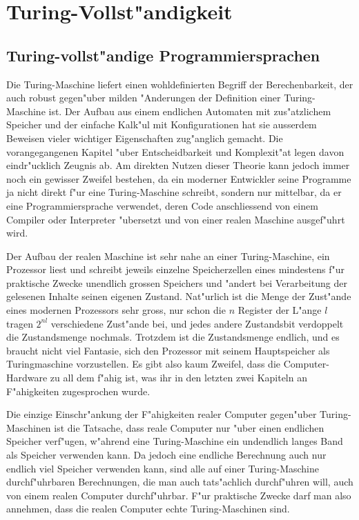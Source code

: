 %
%
%
\chapter{Turing-Vollst"andigkeit\label{chapter-vollstaendigkeit}}
\section{Turing-vollst"andige Programmiersprachen}
Die Turing-Maschine liefert einen wohldefinierten Begriff der
Berechenbarkeit, der auch robust gegen"uber milden "Anderungen
der Definition einer Turing-Maschine ist.
Der Aufbau aus einem endlichen Automaten mit zus"atzlichem
Speicher und der einfache Kalk"ul mit Konfigurationen hat
sie ausserdem Beweisen vieler wichtiger Eigenschaften zug"anglich
gemacht. Die vorangegangenen Kapitel "uber Entscheidbarkeit und
Komplexit"at legen davon eindr"ucklich Zeugnis ab. Am direkten
Nutzen dieser Theorie kann jedoch immer noch ein gewisser Zweifel
bestehen, da ein moderner Entwickler seine Programme ja nicht
direkt f"ur eine Turing-Maschine schreibt, sondern nur mittelbar,
da er eine Programmiersprache verwendet, deren Code anschliessend
von einem Compiler oder Interpreter "ubersetzt und von einer realen
Maschine ausgef"uhrt wird.

Der Aufbau der realen Maschine ist sehr
nahe an einer Turing-Maschine, ein Prozessor liest und schreibt
jeweils einzelne
Speicherzellen eines mindestens f"ur praktische Zwecke unendlich
grossen Speichers und "andert bei Verarbeitung der gelesenen
Inhalte seinen eigenen Zustand. Nat"urlich ist die Menge der
Zust"ande eines modernen Prozessors sehr gross, nur schon die $n$
Register der L"ange $l$ tragen $2^{nl}$ verschiedene Zust"ande bei,
und jedes andere Zustandsbit verdoppelt die Zustandsmenge nochmals.
Trotzdem ist die Zustandsmenge endlich, und es braucht nicht viel
Fantasie, sich den Prozessor mit seinem Hauptspeicher als Turingmaschine
vorzustellen. Es gibt also kaum Zweifel, dass die Computer-Hardware
zu all dem f"ahig ist, was ihr in den letzten zwei Kapiteln an
F"ahigkeiten zugesprochen wurde.

Die einzige Einschr"ankung der F"ahigkeiten realer Computer gegen"uber
Turing-Maschinen ist
die Tatsache, dass reale Computer nur "uber einen endlichen Speicher
verf"ugen, w"ahrend eine Turing-Maschine ein undendlich langes Band
als Speicher verwenden kann. Da jedoch eine endliche Berechnung auch
nur endlich viel Speicher verwenden kann, sind alle auf einer Turing-Maschine
durchf"uhrbaren Berechnungen, die man auch tats"achlich durchf"uhren
will, auch von einem realen Computer durchf"uhrbar. F"ur praktische
Zwecke darf man also annehmen, dass die realen Computer echte Turing-Maschinen
sind.


